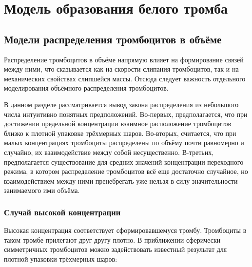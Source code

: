 \chapter{Модель образования белого тромба}
\label{chapter:blood} 

\section{Модели распределения тромбоцитов в объёме}
\label{section:volume_distribution_models}



Распределение тромбоцитов в объёме напрямую влияет на формирование связей между ними,
что сказывается как на скорости слипания тромбоцитов, так и на механических свойствах слипшейся массы.
Отсюда следует важность отдельного моделирования объёмного распределения тромбоцитов.

В данном разделе рассматривается вывод закона распределения из небольшого числа интуитивно понятных предположений.
Во-первых, предполагается, что при достижении предельной концентрации взаимное расположение тромбоцитов
близко к плотной упаковке трёхмерных шаров.
Во-вторых, считается, что при малых концентрациях тромбоциты распределены по объёму почти равномерно и случайно,
их взаимодействие между собой несущественно.
В-третьих, предполагается существование для средних значений концентрации переходного режима,
в котором распределение тромбоцитов всё еще достаточно случайное,
но взаимодействием между ними пренебрегать уже нельзя в силу значительности занимаемого ими объёма.


\subsection{Случай высокой концентрации}
\label{subsection:volume_distribution_models:high_concentration}

Высокая концентрация соответствует сформировавшемуся тромбу.
Тромбоциты в таком тромбе прилегают друг другу плотно.
В приближении сферически симметричных тромбоцитов
можно задействовать известный результат для плотной упаковки трёхмерных шаров:

